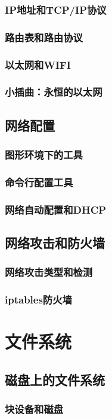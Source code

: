 \documentclass[amstex,twoside]{ctexbook}
\begin{document}
\subsection{  IP地址和TCP/IP协议}
\subsection{  路由表和路由协议}
\subsection{ 以太网和WIFI}
\subsection*{  小插曲：永恒的以太网}

\section{网络配置\label{sec:ifconfig}}
\subsection{  图形环境下的工具	}
\subsection{ 命令行配置工具}
\subsection{ 网络自动配置和DHCP}
\section{  网络攻击和防火墙	}
\subsection{ 网络攻击类型和检测}
\subsection{  iptables防火墙}

\chapter{文件系统}
\section{  磁盘上的文件系统	}
\subsection{  块设备和磁盘}
\end{document}
